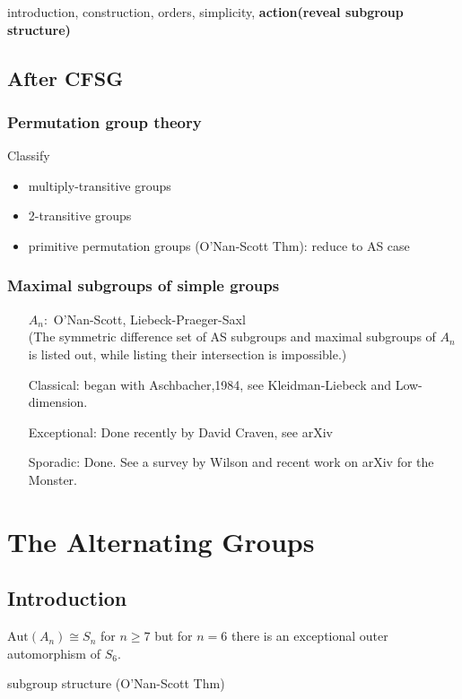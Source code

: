 \documentclass[a4,11pt]{article}
\def\Aut{\mathrm{Aut}}
\begin{document}
introduction, construction, orders, simplicity, \textbf{action(reveal subgroup structure)}

\newpage
\subsection{After CFSG}
\subsubsection{Permutation group theory}

Classify
\begin{itemize}
	\item multiply-transitive groups
	\item 2-transitive groups
	\item primitive permutation groups (O'Nan-Scott Thm): reduce to AS case
\end{itemize}



\subsubsection{Maximal subgroups of simple groups}

\begin{itemize}
	\item[$A_n:$] O'Nan-Scott, Liebeck-Praeger-Saxl \\(The symmetric difference set of AS subgroups and maximal subgroups of $A_n$ is listed out, while listing their intersection is impossible.)
	\item[Classical:] began with Aschbacher,1984, see Kleidman-Liebeck and Low-dimension.
	\item[Exceptional:] Done recently by David Craven, see arXiv
	\item[Sporadic:] Done. See a survey by Wilson and recent work on arXiv for the Monster.
\end{itemize}



\newpage
\section{The Alternating Groups}
\subsection{Introduction}
$\Aut(A_n)\cong S_n$ for $n\geq 7$ but for $n=6$ there is an exceptional outer automorphism of $S_6$.

subgroup structure (O'Nan-Scott Thm)
\end{document}
